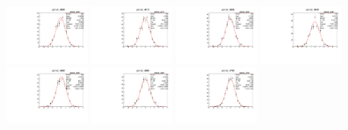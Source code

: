 \begin{figure}[h]\centering
    \includegraphics[width=0.24\textwidth]{figure/io_wo_bkg/polarization/pull_polarization_alpha0_4600.pdf}
    \includegraphics[width=0.24\textwidth]{figure/io_wo_bkg/polarization/pull_polarization_alpha0_4612.pdf}
    \includegraphics[width=0.24\textwidth]{figure/io_wo_bkg/polarization/pull_polarization_alpha0_4626.pdf}
    \includegraphics[width=0.24\textwidth]{figure/io_wo_bkg/polarization/pull_polarization_alpha0_4640.pdf}
    \includegraphics[width=0.24\textwidth]{figure/io_wo_bkg/polarization/pull_polarization_alpha0_4660.pdf}
    \includegraphics[width=0.24\textwidth]{figure/io_wo_bkg/polarization/pull_polarization_alpha0_4680.pdf}
    \includegraphics[width=0.24\textwidth]{figure/io_wo_bkg/polarization/pull_polarization_alpha0_4700.pdf}

\end{figure}
